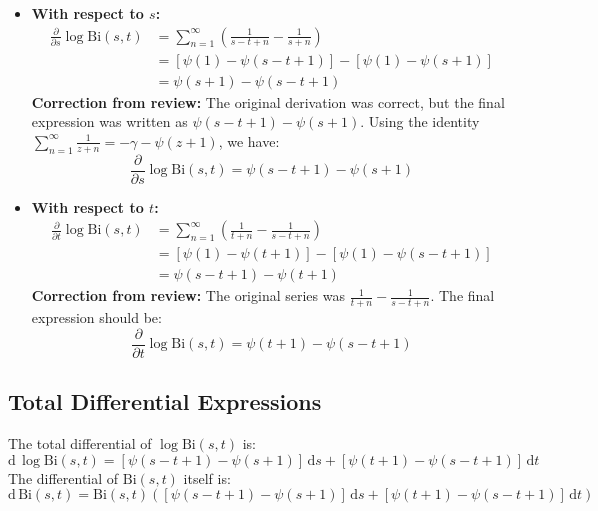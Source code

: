 \documentclass{article}
\newcommand{\Bi}{\mathrm{Bi}}
\newcommand{\diff}{\mathrm{d}}
\newcommand{\eulergam}{\gamma} %
\begin{document}
\begin{itemize}
    \item \textbf{With respect to $s$:}
    \begin{align*}
    \frac{\partial}{\partial s} \log \Bi(s,t) &= \sum_{n=1}^\infty \left(
    \frac{1}{s-t+n}
    - \frac{1}{s+n}
    \right) \\
    &= \left[ \psi(1) - \psi(s-t+1) \right] - \left[ \psi(1) - \psi(s+1) \right] \\
    &= \psi(s+1) - \psi(s-t+1)
    \end{align*}
    \textbf{Correction from review:} The original derivation was correct, but the final expression was written as $\psi(s-t+1) - \psi(s+1)$. Using the identity $\sum_{n=1}^\infty \frac{1}{z+n} = -\eulergam - \psi(z+1)$, we have:
    $$
    \frac{\partial}{\partial s} \log \Bi(s,t) = \psi(s-t+1) - \psi(s+1)
    $$

    \item \textbf{With respect to $t$:}
    \begin{align*}
    \frac{\partial}{\partial t} \log \Bi(s,t) &= \sum_{n=1}^\infty \left(
    \frac{1}{t+n}
    - \frac{1}{s-t+n}
    \right) \\
    &= \left[ \psi(1) - \psi(t+1) \right] - \left[ \psi(1) - \psi(s-t+1) \right] \\
    &= \psi(s-t+1) - \psi(t+1)
    \end{align*}
    \textbf{Correction from review:} The original series was $\frac{1}{t+n} - \frac{1}{s-t+n}$. The final expression should be:
    $$
    \frac{\partial}{\partial t} \log \Bi(s,t) = \psi(t+1) - \psi(s-t+1)
    $$
\end{itemize}

\subsection{Total Differential Expressions}

The total differential of $\log \Bi(s,t)$ is:
\begin{equation}
\diff\,\log \Bi(s,t) = \left[ \psi(s-t+1) - \psi(s+1) \right]\,\diff s + \left[ \psi(t+1) - \psi(s-t+1) \right]\,\diff t
\end{equation}
The differential of $\Bi(s,t)$ itself is:
\begin{equation}
\diff\,\Bi(s,t) = \Bi(s,t) \left( \left[ \psi(s-t+1) - \psi(s+1) \right]\,\diff s + \left[ \psi(t+1) - \psi(s-t+1) \right]\,\diff t \right)
\end{equation}
\end{document}
